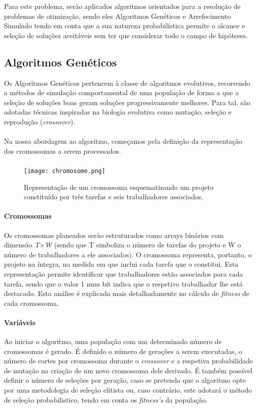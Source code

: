 \documentclass[a4paper]{article}
\begin{document}
Para este problema, serão aplicados algoritmos orientados para a resolução de problemas de otimização, sendo eles Algoritmos Genéticos e Arrefecimento Simulado tendo em conta que a sua natureza probabilística permite o alcance e seleção de soluções aceitáveis sem ter que considerar todo o campo de hipóteses.

\subsection{Algoritmos Genéticos}
Os Algoritmos Genéticos pertencem à classe de algoritmos evolutivos, recorrendo a métodos de simulação comportamental de uma população de forma a que a seleção de soluções boas geram soluções progressivamente melhores. Para tal, são adotadas técnicas inspiradas na biologia evolutiva como mutação, seleção e reprodução (\textit{crossover}).
\paragraph{}
Na nossa abordagem ao algoritmo, começamos pela definição da representação dos cromossomas a serem processados.
\paragraph{}
\begin{figure}[!ht]
	\centering
	\texttt{[image: chromosome.png]}
	\caption{Representação de um cromossoma esquematizando um projeto constituído por três tarefas e seis trabalhadores associados.}
\end{figure}
\paragraph{Cromossomas}Os cromossomas planeados serão estruturados como arrays binários com dimensão \textit{T$\times$W} (sendo que T simboliza o número de tarefas do projeto e W o número de trabalhadores a ele associados). O cromossoma representa, portanto, o projeto na íntegra, na medida em que inclui cada tarefa que o constitui. Esta representação permite identificar que trabalhadores estão associados para cada tarefa, sendo que o valor 1 num bit indica que o respetivo trabalhador lhe está destacado. Esta análise é explicada mais detalhadamente no cálculo de \textit{fitness} de cada cromossoma.
\paragraph{Variáveis}
Ao iniciar o algoritmo, uma população com um determinado número de cromossomas é gerado. É definido o número de gerações a serem executadas, o número de cortes por cromossoma durante o \textit{crossover} e a respetiva probabilidade de mutação na criação de um novo cromossoma dele derivado. É também possível definir o número de seleções por geração, caso se pretenda que o algoritmo opte por uma metodologia de seleção elitista ou, caso contrário, este adotará o método de seleção probabilistico, tendo em conta os \textit{fitness's} da população.
\end{document}
